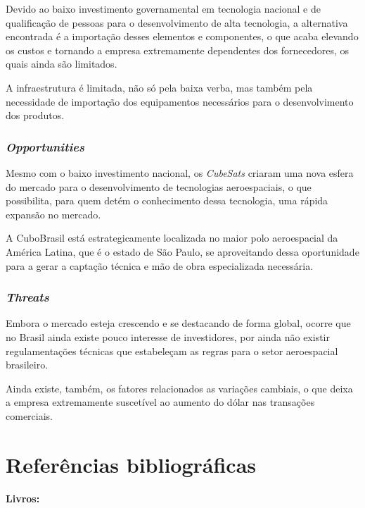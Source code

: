 \documentclass[
	12pt,				%
	openright,			%
	oneside,			%
	a4paper,			%
	english,			%
	french,				%
	spanish,			%
	brazil				%
	]{abntex2}
\begin{document}
	Devido ao baixo investimento governamental em tecnologia nacional e de qualificação de pessoas para o desenvolvimento de alta tecnologia, a alternativa encontrada é a importação desses elementos e componentes, o que acaba elevando os custos e tornando a empresa extremamente dependentes dos fornecedores, os quais ainda são limitados. 
	
	A infraestrutura é limitada, não só pela baixa verba, mas também pela necessidade de importação dos equipamentos necessários para o desenvolvimento dos produtos.

\subsection[Opportunities]{\textit{Opportunities}}

	Mesmo com o baixo investimento nacional, os \textit{CubeSats} criaram uma nova esfera do mercado para o desenvolvimento de tecnologias aeroespaciais, o que possibilita, para quem detém o conhecimento dessa tecnologia, uma rápida expansão no mercado. 
	
	A CuboBrasil está estrategicamente localizada no maior polo aeroespacial da América Latina, que é o estado de São Paulo, se aproveitando dessa oportunidade para a gerar a captação técnica e mão de obra especializada necessária.

\subsection[Threats]{\textit{Threats}}
	
	Embora o mercado esteja crescendo e se destacando de forma global, ocorre que no Brasil ainda existe pouco interesse de investidores, por ainda não existir regulamentações técnicas que estabeleçam as regras para o setor aeroespacial brasileiro.
	
	Ainda existe, também, os fatores relacionados as variações cambiais, o que deixa a empresa extremamente suscetível ao aumento do dólar nas transações comerciais.
	
\chapter[Referências bibliográficas]{Referências bibliográficas}



\textbf{Livros:}
	
\end{document}
